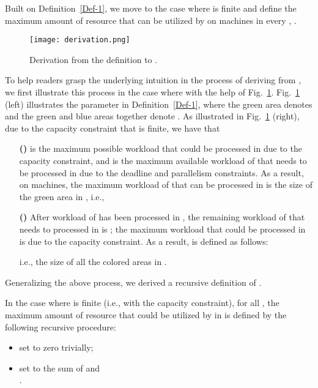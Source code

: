 \documentclass[10pt,journal,compsoc]{IEEEtran}
\newcommand{\rmnum}[1]{\romannumeral #1}
\begin{document}
Built on Definition~\ref{Def-1}, we move to the case where  is finite and define the maximum amount of resource  that can be utilized by  on  machines in every , .





\begin{figure}[!ht]\centering

\texttt{[image: derivation.png]}

  \caption{Derivation from the definition  to .}\label{Fig.2}
\end{figure}




To help readers grasp the underlying intuition in the process of deriving  from , we first illustrate this process in the case where  with the help of Fig.~\ref{Fig.2}. Fig.~\ref{Fig.2} (left) illustrates the parameter  in Definition~\ref{Def-1}, where the green area denotes  and the green and blue areas together denote . As illustrated in Fig.~\ref{Fig.2} (right), due to the capacity constraint that  is finite, we have that
\begin{enumerate}
\item [\textbf{(\rmnum{1})}]  is the maximum possible workload that could be processed in  due to the capacity constraint, and  is the maximum available workload of  that needs to be processed in  due to the deadline and parallelism constraints. As a result, on  machines, the maximum workload  of  that can be processed in  is the size of the green area in , i.e.,
    

\item [\textbf{(\rmnum{2})}] After  workload of  has been processed in , the remaining workload of  that needs to processed in  is ; the maximum workload that could be processed in  is  due to the capacity constraint. As a result,  is defined as follows:

i.e., the size of all the colored areas in .
\end{enumerate}
Generalizing the above process, we derived a recursive definition of .


\begin{definition}\label{Def-2}
In the case where  is finite (i.e., with the capacity constraint), for all , the maximum amount of resource  that could be utilized by  in  is defined by the following recursive procedure:
\begin{itemize}
  \setlength\itemsep{0.3em}
\item set  to zero trivially;
\item set  to the sum of  and \\
.
\end{itemize}
\end{definition}
\end{document}

